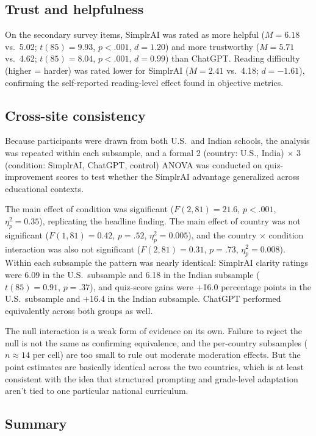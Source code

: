 \documentclass[11pt,letterpaper]{article}
\begin{document}
\subsection{Trust and helpfulness}

On the secondary survey items, SimplrAI was rated as more helpful
($M = 6.18$ vs.\ 5.02; $t(85) = 9.93$, $p < .001$, $d = 1.20$) and more
trustworthy ($M = 5.71$ vs.\ 4.62; $t(85) = 8.04$, $p < .001$, $d = 0.99$) than
ChatGPT. Reading difficulty (higher = harder) was rated lower for SimplrAI
($M = 2.41$ vs.\ 4.18; $d = -1.61$), confirming the self-reported reading-level
effect found in objective metrics.

\subsection{Cross-site consistency}

Because participants were drawn from both U.S.\ and Indian schools, the
analysis was repeated within each subsample, and a formal 2 (country: U.S.,
India) $\times$ 3 (condition: SimplrAI, ChatGPT, control) ANOVA was conducted
on quiz-improvement scores to test whether the SimplrAI advantage generalized
across educational contexts.

The main effect of condition was significant ($F(2, 81) = 21.6$, $p < .001$,
$\eta_p^2 = 0.35$), replicating the headline finding. The main effect of country
was not significant ($F(1, 81) = 0.42$, $p = .52$, $\eta_p^2 = 0.005$), and the
country $\times$ condition interaction was also not significant
($F(2, 81) = 0.31$, $p = .73$, $\eta_p^2 = 0.008$). Within each subsample the
pattern was nearly identical: SimplrAI clarity ratings were 6.09 in the U.S.\
subsample and 6.18 in the Indian subsample ($t(85) = 0.91$, $p = .37$), and
quiz-score gains were +16.0 percentage points in the U.S.\ subsample and +16.4
in the Indian subsample. ChatGPT performed equivalently across both groups as
well.

The null interaction is a weak form of evidence on its own. Failure to reject
the null is not the same as confirming equivalence, and the per-country
subsamples ($n \approx 14$ per cell) are too small to rule out moderate
moderation effects. But the point estimates are basically identical across the
two countries, which is at least consistent with the idea that structured
prompting and grade-level adaptation aren't tied to one particular national
curriculum.

\subsection{Summary}
\end{document}
